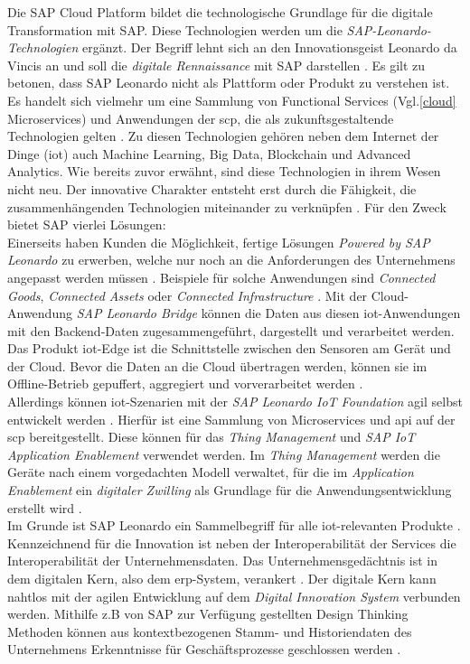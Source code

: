 Die SAP Cloud Platform bildet die technologische Grundlage für die digitale Transformation mit SAP. Diese Technologien werden um die \textit{SAP-Leonardo-Technologien} ergänzt. Der Begriff lehnt sich an den Innovationsgeist Leonardo da Vincis an und soll die \textit{digitale Rennaissance} mit SAP  darstellen \citep{Howells2017}. Es gilt zu betonen, dass SAP Leonardo nicht als Plattform oder Produkt zu verstehen ist. Es handelt sich vielmehr um eine Sammlung von Functional Services (Vgl.\ref{cloud} Microservices) und Anwendungen der \ac{scp}, die als zukunftsgestaltende Technologien gelten \citep{Elsner2018}. Zu diesen Technologien gehören neben dem Internet der Dinge (\acf{iot}) auch Machine Learning, Big Data, Blockchain und Advanced Analytics. Wie bereits zuvor erwähnt, sind diese Technologien in ihrem Wesen nicht neu. Der innovative Charakter entsteht erst durch die Fähigkeit, die zusammenhängenden Technologien miteinander zu verknüpfen \citep{Utecht2018}. Für den Zweck bietet SAP vierlei Lösungen:
 \\Einerseits haben Kunden die Möglichkeit, fertige Lösungen \textit{Powered by SAP Leonardo} zu erwerben, welche nur noch an die Anforderungen des Unternehmens angepasst werden müssen \citep{Utecht2018}. Beispiele für solche Anwendungen sind \textit{Connected Goods}, \textit{Connected Assets} oder \textit{Connected Infrastructure} \citep{Elsner2018}. Mit der Cloud-Anwendung \textit{SAP Leonardo Bridge} können die Daten aus diesen \ac{iot}-Anwendungen mit den Backend-Daten zugesammengeführt, dargestellt und verarbeitet werden. Das Produkt \ac{iot}-Edge ist die Schnittstelle zwischen den Sensoren am Gerät und der Cloud. Bevor die Daten an die Cloud übertragen werden, können sie im Offline-Betrieb gepuffert, aggregiert und vorverarbeitet werden \citep{Utecht2018}.
\\Allerdings können \ac{iot}-Szenarien mit der \textit{SAP Leonardo IoT Foundation} agil selbst entwickelt werden \citep{Elsner2018}. Hierfür ist eine Sammlung von Microservices und \ac{api} auf der \ac{scp} bereitgestellt. Diese können für das \textit{Thing Management} und \textit{SAP IoT Application Enablement} verwendet werden. Im \textit{Thing Management} werden die Geräte nach einem vorgedachten Modell verwaltet, für die im \textit{Application Enablement} ein \textit{digitaler Zwilling} als Grundlage für die Anwendungsentwicklung erstellt wird \citep{Elsner2018}.
\\Im Grunde ist SAP Leonardo ein Sammelbegriff für alle \ac{iot}-relevanten Produkte \citep{Utecht2018}. Kennzeichnend für die Innovation ist neben der Interoperabilität der Services die Interoperabilität der Unternehmensdaten. Das Unternehmensgedächtnis ist in dem digitalen Kern, also dem \ac{erp}-System, verankert \citep{Elsner2018}. Der digitale Kern kann nahtlos mit der agilen Entwicklung auf dem \textit{Digital Innovation System} verbunden werden. Mithilfe  z.B von SAP zur Verfügung gestellten Design Thinking Methoden können aus kontextbezogenen Stamm- und Historiendaten des Unternehmens Erkenntnisse für Geschäftsprozesse geschlossen werden \citep{Elsner2018}.
